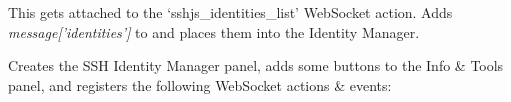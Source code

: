 \documentclass[letterpaper,10pt,openany]{sphinxmanual}
\begin{document}

\begin{fulllineitems}
\label{Applications/terminal/plugin_ssh:GateOne.SSH.incomingIDsAction}
This gets attached to the `sshjs\_identities\_list' WebSocket action.  Adds \emph{message{[}'identities'{]}} to  and places them into the Identity Manager.

\end{fulllineitems}


\begin{fulllineitems}
\label{Applications/terminal/plugin_ssh:GateOne.SSH.init}
Creates the SSH Identity Manager panel, adds some buttons to the Info \& Tools panel, and registers the following WebSocket actions \& events:


\end{fulllineitems}
\end{document}
